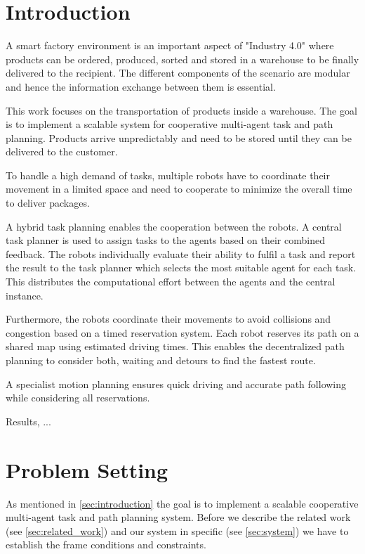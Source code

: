 \documentclass[journal]{IEEEtran}
\newcommand{\compref}[1]{\autoref{#1} \nameref{#1}}
\begin{document}
\section{Introduction}
\label{sec:introduction}
A smart factory environment is an important aspect of "Industry 4.0" where products can be ordered, produced, sorted and stored in a warehouse to be finally delivered to the recipient. The different components of the scenario are modular and hence the information exchange between them is essential.

This work focuses on the transportation of products inside a warehouse. The goal is to implement a scalable system for cooperative multi-agent task and path planning. Products arrive unpredictably and need to be stored until they can be delivered to the customer.

To handle a high demand of tasks, multiple robots have to coordinate their movement in a limited space and need to cooperate to minimize the overall time to deliver packages.

A hybrid task planning enables the cooperation between the robots. A central task planner is used to assign tasks to the agents based on their combined feedback. The robots individually evaluate their ability to fulfil a task and report the result to the task planner which selects the most suitable agent for each task. This distributes the computational effort between the agents and the central instance.

Furthermore, the robots coordinate their movements to avoid collisions and congestion based on a timed reservation system. Each robot reserves its path on a shared map using estimated driving times. This enables the decentralized path planning to consider both, waiting and detours to find the fastest route.

A specialist motion planning ensures quick driving and accurate path following while considering all reservations.

Results, ...

\section{Problem Setting}
\label{sec:problem_setting}
As mentioned in \compref{sec:introduction} the goal is to implement a scalable cooperative multi-agent task and path planning system. 
Before we describe the related work (see \autoref{sec:related_work}) and our system in specific (see \autoref{sec:system}) we have to establish the frame conditions and constraints.
\end{document}
